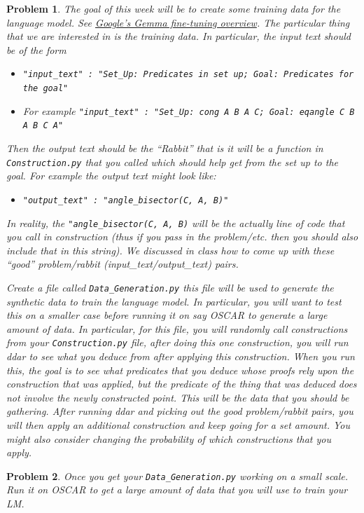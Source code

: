 \documentclass{article}
\newtheorem{problem}{Problem}
\begin{document}
\begin{problem}
    The goal of this week will be to create some training data for the language model. See \href{https://ai.google.dev/gemma/docs/tune}{Google's Gemma fine-tuning overview}. The particular thing that we are interested in is the training data. In particular, the input text should be of the form
    \begin{itemize}
        \item \verb|"input_text" : "Set_Up: Predicates in set up; Goal: Predicates for the goal"|
        \item For example \verb|"input_text" : "Set_Up: cong A B A C; Goal: eqangle C B A B C A"|
    \end{itemize}
    Then the output text should be the ``Rabbit'' that is it will be a function in \verb|Construction.py| that you called which should help get from the set up to the goal. For example the output text might look like:
    \begin{itemize}
        \item \verb|"output_text" : "angle_bisector(C, A, B)"|
    \end{itemize}
    In reality, the \verb|"angle_bisector(C, A, B)| will be the actually line of code that you call in construction (thus if you pass in the problem/etc. then you should also include that in this string). We discussed in class how to come up with these ``good'' problem/rabbit (input\_text/output\_text) pairs. 

    \noindent Create a file called \verb|Data_Generation.py| this file will be used to generate the synthetic data to train the language model. In particular, you will want to test this on a smaller case before running it on say OSCAR to generate a large amount of data. In particular, for this file, you will randomly call constructions from your \verb|Construction.py| file, after doing this one construction, you will run ddar to see what you deduce from after applying this construction. When you run this, the goal is to see what predicates that you deduce whose proofs rely upon the construction that was applied, but the predicate of the thing that was deduced does not involve the newly constructed point. This will be the data that you should be gathering. After running ddar and picking out the good problem/rabbit pairs, you will then apply an additional construction and keep going for a set amount. You might also consider changing the probability of which constructions that you apply. 
\end{problem}

\begin{problem}
    Once you get your \verb|Data_Generation.py| working on a small scale. Run it on OSCAR to get a large amount of data that you will use to train your LM. 
\end{problem}
\end{document}
